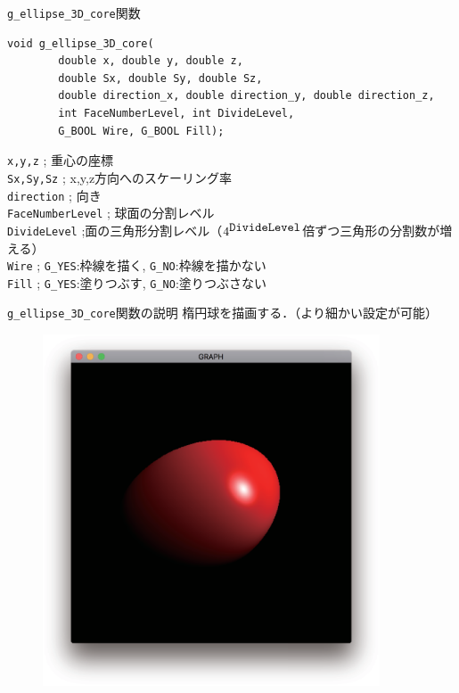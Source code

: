 \documentclass[platex,a4paper,12pt]{jsarticle}%
\begin{document}
\begin{itembox}[l]{\texttt{g\_ellipse\_3D\_core}関数}
\begin{verbatim}
void g_ellipse_3D_core(
        double x, double y, double z,
        double Sx, double Sy, double Sz,
        double direction_x, double direction_y, double direction_z,
        int FaceNumberLevel, int DivideLevel, 
        G_BOOL Wire, G_BOOL Fill);   
\end{verbatim}
\verb|x,y,z| ; 重心の座標\\
\verb|Sx,Sy,Sz| ; x,y,z方向へのスケーリング率\\
\verb|direction| ; 向き\\
\verb|FaceNumberLevel| ; 球面の分割レベル\\
\verb|DivideLevel| ;面の三角形分割レベル（$4^{\verb|DivideLevel|}$倍ずつ三角形の分割数が増える）\\
\verb|Wire| ; \verb|G_YES|:枠線を描く, \verb|G_NO|:枠線を描かない \\
\verb|Fill| ; \verb|G_YES|:塗りつぶす, \verb|G_NO|:塗りつぶさない
\end{itembox}

\begin{itembox}[l]{\texttt{g\_ellipse\_3D\_core}関数の説明}
楕円球を描画する．（より細かい設定が可能）
\end{itembox}

\begin{figure}[htb]
\centering
\includegraphics[width=100mm]{./Figures/eps/Canvas_g_ellipse_SDL.eps}
\end{figure}
\end{document}
